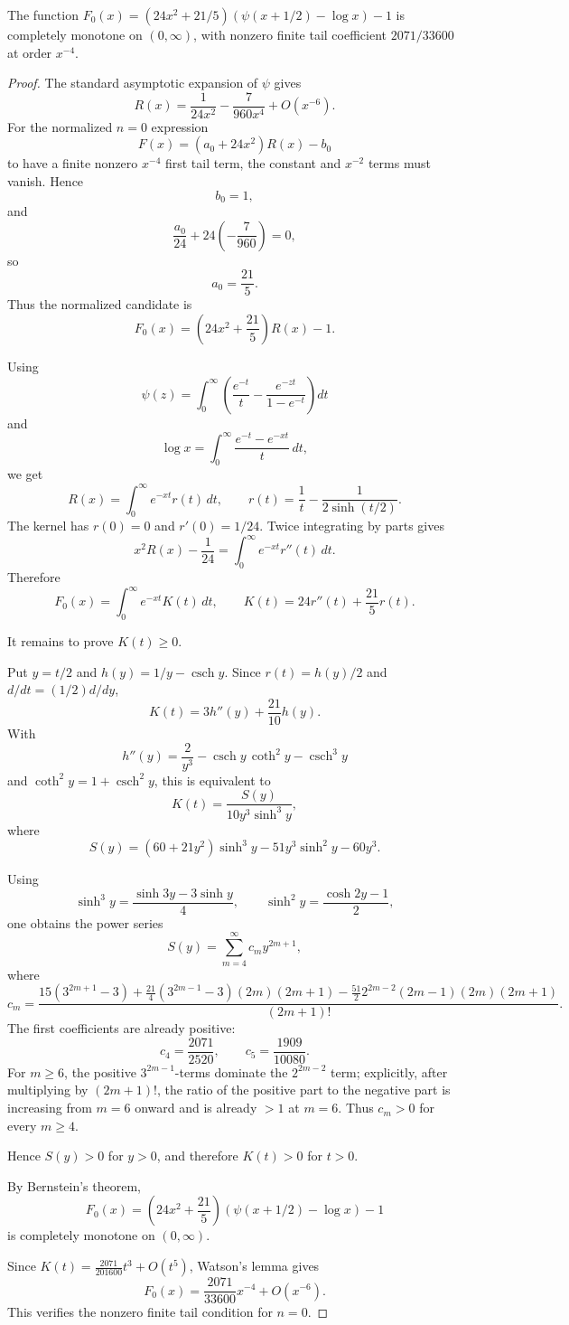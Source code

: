 \begin{lemma}[Yang Detemple R normalized \(n=0\) complete monotonicity certificate]
\label{res:yang-detemple-r-n0-cm-certificate}
The function \(F_0(x)=\left(24x^2+21/5\right)(\psi(x+1/2)-\log x)-1\) is completely monotone on \((0,\infty)\), with nonzero finite tail coefficient \(2071/33600\) at order \(x^{-4}\).
\end{lemma}
\begin{proof}
The standard asymptotic expansion of \(\psi\) gives
\[
R(x)=\frac{1}{24x^2}-\frac{7}{960x^4}+O(x^{-6}).
\]
For the normalized \(n=0\) expression
\[
F(x)=(a_0+24x^2)R(x)-b_0
\]
to have a finite nonzero \(x^{-4}\) first tail term, the constant and \(x^{-2}\) terms must vanish.  Hence
\[
b_0=1,
\]
and
\[
\frac{a_0}{24}+24\left(-\frac{7}{960}\right)=0,
\]
so
\[
a_0=\frac{21}{5}.
\]
Thus the normalized candidate is
\[
F_0(x)=\left(24x^2+\frac{21}{5}\right)R(x)-1.
\]

Using
\[
\psi(z)=\int_0^\infty\left(\frac{e^{-t}}{t}-\frac{e^{-zt}}{1-e^{-t}}\right)dt
\]
and
\[
\log x=\int_0^\infty\frac{e^{-t}-e^{-xt}}{t}\,dt,
\]
we get
\[
R(x)=\int_0^\infty e^{-xt}r(t)\,dt,
\qquad
r(t)=\frac1t-\frac{1}{2\sinh(t/2)}.
\]
The kernel has \(r(0)=0\) and \(r'(0)=1/24\).  Twice integrating by parts gives
\[
x^2R(x)-\frac1{24}=\int_0^\infty e^{-xt}r''(t)\,dt.
\]
Therefore
\[
F_0(x)=\int_0^\infty e^{-xt}K(t)\,dt,
\qquad
K(t)=24r''(t)+\frac{21}{5}r(t).
\]

It remains to prove \(K(t)\ge0\).

Put \(y=t/2\) and \(h(y)=1/y-\operatorname{csch}y\).  Since \(r(t)=h(y)/2\) and \(d/dt=(1/2)d/dy\),
\[
K(t)=3h''(y)+\frac{21}{10}h(y).
\]
With
\[
h''(y)=\frac{2}{y^3}-\operatorname{csch}y\,\coth^2y-\operatorname{csch}^3y
\]
and \(\coth^2y=1+\operatorname{csch}^2y\), this is equivalent to
\[
K(t)=
\frac{
S(y)
}{
10y^3\sinh^3y
},
\]
where
\[
S(y)=(60+21y^2)\sinh^3y-51y^3\sinh^2y-60y^3.
\]

Using
\[
\sinh^3y=\frac{\sinh3y-3\sinh y}{4},
\qquad
\sinh^2y=\frac{\cosh2y-1}{2},
\]
one obtains the power series
\[
S(y)=\sum_{m=4}^{\infty} c_my^{2m+1},
\]
where
\[
c_m=
\frac{
15(3^{2m+1}-3)
+\frac{21}{4}(3^{2m-1}-3)(2m)(2m+1)
-\frac{51}{2}2^{2m-2}(2m-1)(2m)(2m+1)
}{
(2m+1)!}.
\]
The first coefficients are already positive:
\[
c_4=\frac{2071}{2520},\qquad
c_5=\frac{1909}{10080}.
\]
For \(m\ge6\), the positive \(3^{2m-1}\)-terms dominate the \(2^{2m-2}\) term; explicitly, after multiplying by \((2m+1)!\), the ratio of the positive part to the negative part is increasing from \(m=6\) onward and is already \(>1\) at \(m=6\).  Thus \(c_m>0\) for every \(m\ge4\).

Hence \(S(y)>0\) for \(y>0\), and therefore \(K(t)>0\) for \(t>0\).

By Bernstein's theorem,
\[
F_0(x)=\left(24x^2+\frac{21}{5}\right)(\psi(x+1/2)-\log x)-1
\]
is completely monotone on \((0,\infty)\).

Since \(K(t)=\frac{2071}{201600}t^3+O(t^5)\), Watson's lemma gives
\[
F_0(x)=\frac{2071}{33600}x^{-4}+O(x^{-6}).
\]
This verifies the nonzero finite tail condition for \(n=0\).
\end{proof}

